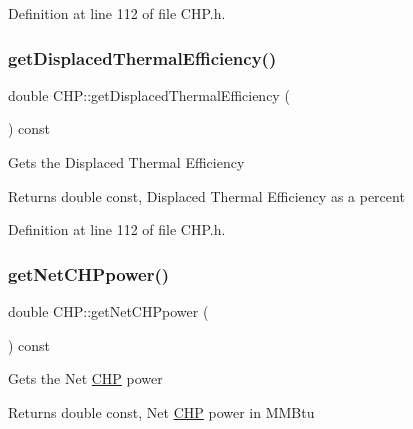 Definition at line 112 of file C\+H\+P.\+h.

\mbox{\label{class_c_h_p_a66b1b0e6a0d7f3181b3c1dfb590ab523}} 
\subsubsection{\texorpdfstring{get\+Displaced\+Thermal\+Efficiency()}{getDisplacedThermalEfficiency()}\hspace{0.1cm}{\footnotesize\ttfamily [3/3]}}
{\footnotesize\ttfamily double C\+H\+P\+::get\+Displaced\+Thermal\+Efficiency (\begin{DoxyParamCaption}{ }\end{DoxyParamCaption}) const\hspace{0.3cm}{\ttfamily [inline]}}

Gets the Displaced Thermal Efficiency

\begin{DoxyReturn}{Returns}
double const, Displaced Thermal Efficiency as a percent 
\end{DoxyReturn}


Definition at line 112 of file C\+H\+P.\+h.

\mbox{\label{class_c_h_p_a317f3df613b61f401bc5c4b69fddd0cf}} 
\subsubsection{\texorpdfstring{get\+Net\+C\+H\+Ppower()}{getNetCHPpower()}\hspace{0.1cm}{\footnotesize\ttfamily [1/3]}}
{\footnotesize\ttfamily double C\+H\+P\+::get\+Net\+C\+H\+Ppower (\begin{DoxyParamCaption}{ }\end{DoxyParamCaption}) const\hspace{0.3cm}{\ttfamily [inline]}}

Gets the Net \hyperlink{class_c_h_p}{C\+HP} power

\begin{DoxyReturn}{Returns}
double const, Net \hyperlink{class_c_h_p}{C\+HP} power in M\+M\+Btu 
\end{DoxyReturn}


